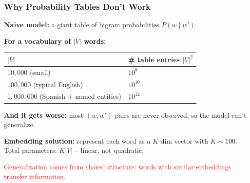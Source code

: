 \documentclass[notes,11pt, aspectratio=169]{beamer}
\begin{document}
\begin{frame}
\frametitle{Why Probability Tables Don't Work}

\textbf{Naive model:} a giant table of bigram probabilities $P(w \mid w')$.

\vspace{8pt}
\textbf{For a vocabulary of $|V|$ words:}
\begin{center}
\renewcommand{\arraystretch}{1.2}
\begin{tabular}{ll}
\toprule
\textbf{$|V|$} & \textbf{\# table entries $|V|^2$} \\
\midrule
$10{,}000$ (small) & $10^8$ \\
$100{,}000$ (typical English) & $10^{10}$ \\
$1{,}000{,}000$ (Spanish + named entities) & $10^{12}$ \\
\bottomrule
\end{tabular}
\end{center}

\vspace{8pt}
\textbf{And it gets worse:} most $(w, w')$ pairs are never observed, so the model can't generalize.

\vspace{8pt}
\textbf{Embedding solution:} represent each word as a $K$-dim vector with $K \sim 100$. Total parameters: $K|V|$ -- linear, not quadratic.

\vspace{4pt}
\textcolor{red}{Generalization comes from shared structure: words with similar embeddings transfer information.}
\end{frame}
\end{document}

